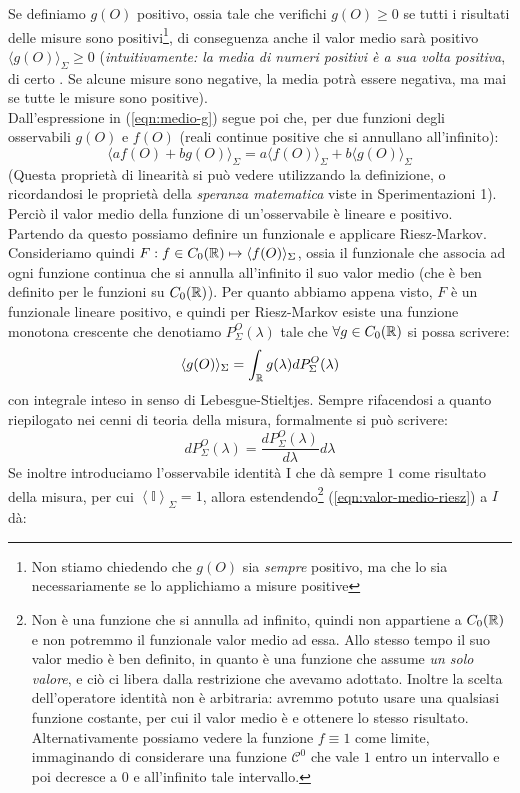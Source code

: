 \documentclass[FisicaTeorica.tex]{subfiles}
\begin{document}
Se definiamo $g(O)$ positivo, ossia tale che verifichi $g(O) \geq 0$ se tutti i risultati delle misure sono positivi\footnote{Non stiamo chiedendo che $g(O)$ sia \textit{sempre} positivo, ma che lo sia necessariamente se lo applichiamo a misure positive}, di conseguenza anche il valor medio sarà positivo $\langle g(O)\rangle_\Sigma \geq 0$ (\textit{intuitivamente: la media di numeri positivi è a sua volta positiva}, di certo . Se alcune misure sono negative, la media potrà essere negativa, ma mai se tutte le misure sono positive).\\
Dall'espressione in (\ref{eqn:medio-g}) segue poi che, per due funzioni degli osservabili $g(O)$ e $f(O)$ (reali continue positive che si annullano all'infinito):
\[
\langle a f(O)+bg(O)\rangle_\Sigma = a\langle f(O)\rangle_\Sigma + b\langle g(O)\rangle_\Sigma
\]
(Questa proprietà di linearità si può vedere utilizzando la definizione, o ricordandosi le proprietà della \textit{speranza matematica} viste in Sperimentazioni 1).\\
Perciò il valor medio della funzione di un'osservabile è lineare e positivo. Partendo da questo possiamo definire un funzionale e applicare Riesz-Markov.\\
Consideriamo quindi $F: f\in C_0(\mathbb{R})\mapsto \langle f(O)\rangle_\Sigma$, ossia il funzionale che associa ad ogni funzione continua che si annulla all'infinito il suo valor medio (che è ben definito per le funzioni su $C_0(\mathbb{R})$). Per quanto abbiamo appena visto, $F$ è un funzionale lineare positivo, e quindi per Riesz-Markov esiste una funzione monotona crescente che denotiamo $P_\Sigma^O(\lambda)$ tale che $\forall g \in C_0(\mathbb{R})$ si possa scrivere: 
\begin{equation}
\langle g(O)\rangle_\Sigma = \int_{\mathbb{R}} g(\lambda) dP_\Sigma^O(\lambda)
    \label{eqn:valor-medio-riesz}
\end{equation}
con integrale inteso in senso di Lebesgue-Stieltjes. Sempre rifacendosi a quanto riepilogato nei cenni di teoria della misura, formalmente si può scrivere:
\begin{equation}
dP_\Sigma^O\left(\lambda\right)=\frac{dP_\Sigma^O\left(\lambda\right)}{d\lambda}d\lambda 
\label{eqn:psigma-change}
\end{equation}
Se inoltre introduciamo l'osservabile identità I che dà sempre $1$ come risultato della misura, per cui $\left\langle\mathbb{I}\right\rangle_\Sigma=1$, allora estendendo\footnote{Non è una funzione che si annulla ad infinito, quindi non appartiene a $C_0(\mathbb{R})$ e non potremmo  il funzionale valor medio ad essa. Allo stesso tempo il suo valor medio è ben definito, in quanto è una funzione che assume \textit{un solo valore}, e ciò ci libera dalla restrizione che avevamo adottato. Inoltre la scelta dell'operatore identità non è arbitraria: avremmo potuto usare una qualsiasi funzione costante, per cui il valor medio è  e ottenere lo stesso risultato. Alternativamente possiamo vedere la funzione $f\equiv 1$ come limite, immaginando di considerare una funzione $\mathcal{C}^0$ che vale $1$ entro un intervallo e poi decresce a $0$ e  all'infinito tale intervallo.} (\ref{eqn:valor-medio-riesz}) a $I$ dà:
\end{document}
